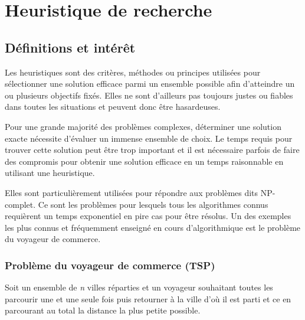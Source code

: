 \chapter{Heuristique de recherche} %

\label{Chapter2} %



\section{Définitions et intérêt}
Les heuristiques sont des critères, méthodes ou principes utilisées pour sélectionner une solution efficace parmi un ensemble possible afin d'atteindre un ou plusieurs objectifs fixés\cite{judea-pearl-heuristics}.
Elles ne sont d'ailleurs pas toujours justes ou fiables dans toutes les situations et peuvent donc être hasardeuses.

Pour une grande majorité des problèmes complexes, déterminer une solution exacte nécessite d'évaluer un immense ensemble de choix. Le temps requis pour trouver cette solution peut être trop important et il est nécessaire parfois de faire des compromis pour obtenir une solution efficace en un temps raisonnable en utilisant une heuristique. 

Elles sont particulièrement utilisées pour répondre aux problèmes dits NP-complet. Ce sont les problèmes pour lesquels tous les algorithmes connus requièrent un temps exponentiel en pire cas pour être résolus. 
Un des exemples les plus connus et fréquemment enseigné en cours d'algorithmique est le problème du voyageur de commerce.

\subsection{Problème du voyageur de commerce (TSP)}
Soit un ensemble de \textit{n} villes réparties et un voyageur souhaitant toutes les parcourir une et une seule fois puis retourner à la ville d'où il est parti et ce en parcourant au total la distance la plus petite possible.

